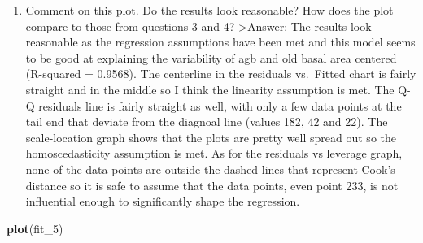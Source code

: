 \documentclass[
]{article}
\newenvironment{Shaded}{\begin{snugshade}}{\end{snugshade}}
\newcommand{\FunctionTok}[1]{\textcolor[rgb]{0.13,0.29,0.53}{\textbf{#1}}}
\newcommand{\NormalTok}[1]{#1}
\providecommand{\tightlist}{%
  \setlength{\itemsep}{0pt}\setlength{\parskip}{0pt}}
\begin{document}
\begin{enumerate}
\def\labelenumi{\alph{enumi}.}
\setcounter{enumi}{5}
\tightlist
\item
  Comment on this plot. Do the results look reasonable? How does the
  plot compare to those from questions 3 and 4? \textgreater Answer: The
  results look reasonable as the regression assumptions have been met
  and this model seems to be good at explaining the variability of agb
  and old basal area centered (R-squared = 0.9568). The centerline in
  the residuals vs.~Fitted chart is fairly straight and in the middle so
  I think the linearity assumption is met. The Q-Q residuals line is
  fairly straight as well, with only a few data points at the tail end
  that deviate from the diagnoal line (values 182, 42 and 22). The
  scale-location graph shows that the plots are pretty well spread out
  so the homoscedasticity assumption is met. As for the residuals vs
  leverage graph, none of the data points are outside the dashed lines
  that represent Cook's distance so it is safe to assume that the data
  points, even point 233, is not influential enough to significantly
  shape the regression.
\end{enumerate}

\begin{Shaded}
\begin{Highlighting}[]
\FunctionTok{plot}\NormalTok{(fit\_5)}
\end{Highlighting}
\end{Shaded}
\end{document}
